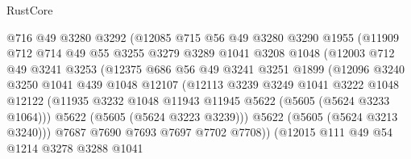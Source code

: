 \begin{lexlean}{RustCore}
\begin{coremodule}
                      @716
                      @49
                      @3280
                      @3292
                      (@12085
                        @715
                        @56
                        @49
                        @3280
                        @3290
                        @1955
                        (@11909
                          @712
                          @714
                          @49
                          @55
                          @3255
                          @3279
                          @3289
                          @1041
                          @3208
                          @1048
                          (@12003
                            @712
                            @49
                            @3241
                            @3253
                            (@12375
                              @686
                              @56
                              @49
                              @3241
                              @3251
                              @1899
                              (@12096
                                @3240
                                @3250
                                @1041
                                @439
                                @1048
                                @12107
                                (@12113
                                  @3239
                                  @3249
                                  @1041
                                  @3222
                                  @1048
                                  @12122
                                  (@11935
                                    @3232
                                    @1048
                                    @11943
                                    @11945
                                    @5622
                                    (@5605 (@5624 @3233 @1064)))
                                  @5622
                                  (@5605 (@5624 @3223 @3239)))
                                @5622
                                (@5605 (@5624 @3213 @3240)))
                              @7687
                              @7690
                              @7693
                              @7697
                              @7702
                              @7708))
                          (@12015
                            @111
                            @49
                            @54
                            @1214
                            @3278
                            @3288
                            @1041

\end{coremodule}
\end{lexlean}
